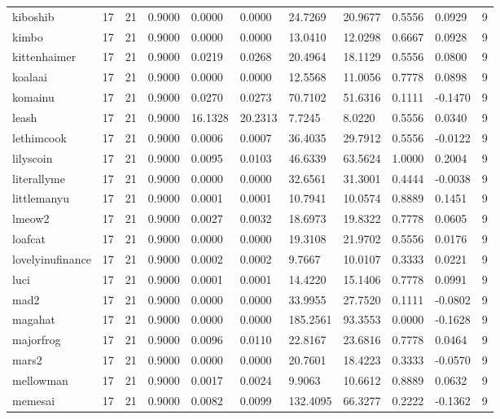 \begin{table}[htbp]
\begin{tabular}{lllllllllll}
kiboshib & 17 & 21 & 0.9000 & 0.0000 & 0.0000 & 24.7269 & 20.9677 & 0.5556 & 0.0929 & 9 \\
kimbo & 17 & 21 & 0.9000 & 0.0000 & 0.0000 & 13.0410 & 12.0298 & 0.6667 & 0.0928 & 9 \\
kittenhaimer & 17 & 21 & 0.9000 & 0.0219 & 0.0268 & 20.4964 & 18.1129 & 0.5556 & 0.0800 & 9 \\
koalaai & 17 & 21 & 0.9000 & 0.0000 & 0.0000 & 12.5568 & 11.0056 & 0.7778 & 0.0898 & 9 \\
komainu & 17 & 21 & 0.9000 & 0.0270 & 0.0273 & 70.7102 & 51.6316 & 0.1111 & -0.1470 & 9 \\
leash & 17 & 21 & 0.9000 & 16.1328 & 20.2313 & 7.7245 & 8.0220 & 0.5556 & 0.0340 & 9 \\
lethimcook & 17 & 21 & 0.9000 & 0.0006 & 0.0007 & 36.4035 & 29.7912 & 0.5556 & -0.0122 & 9 \\
lilyscoin & 17 & 21 & 0.9000 & 0.0095 & 0.0103 & 46.6339 & 63.5624 & 1.0000 & 0.2004 & 9 \\
literallyme & 17 & 21 & 0.9000 & 0.0000 & 0.0000 & 32.6561 & 31.3001 & 0.4444 & -0.0038 & 9 \\
littlemanyu & 17 & 21 & 0.9000 & 0.0001 & 0.0001 & 10.7941 & 10.0574 & 0.8889 & 0.1451 & 9 \\
lmeow2 & 17 & 21 & 0.9000 & 0.0027 & 0.0032 & 18.6973 & 19.8322 & 0.7778 & 0.0605 & 9 \\
loafcat & 17 & 21 & 0.9000 & 0.0000 & 0.0000 & 19.3108 & 21.9702 & 0.5556 & 0.0176 & 9 \\
lovelyinufinance & 17 & 21 & 0.9000 & 0.0002 & 0.0002 & 9.7667 & 10.0107 & 0.3333 & 0.0221 & 9 \\
luci & 17 & 21 & 0.9000 & 0.0001 & 0.0001 & 14.4220 & 15.1406 & 0.7778 & 0.0991 & 9 \\
mad2 & 17 & 21 & 0.9000 & 0.0000 & 0.0000 & 33.9955 & 27.7520 & 0.1111 & -0.0802 & 9 \\
magahat & 17 & 21 & 0.9000 & 0.0000 & 0.0000 & 185.2561 & 93.3553 & 0.0000 & -0.1628 & 9 \\
majorfrog & 17 & 21 & 0.9000 & 0.0096 & 0.0110 & 22.8167 & 23.6816 & 0.7778 & 0.0464 & 9 \\
mars2 & 17 & 21 & 0.9000 & 0.0000 & 0.0000 & 20.7601 & 18.4223 & 0.3333 & -0.0570 & 9 \\
mellowman & 17 & 21 & 0.9000 & 0.0017 & 0.0024 & 9.9063 & 10.6612 & 0.8889 & 0.0632 & 9 \\
memesai & 17 & 21 & 0.9000 & 0.0082 & 0.0099 & 132.4095 & 66.3277 & 0.2222 & -0.1362 & 9 \\

\end{tabular}
\end{table}
